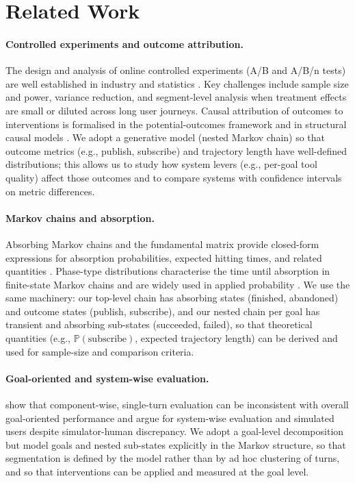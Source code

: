 \section{Related Work}
\label{sec:related_work}

\paragraph{Controlled experiments and outcome attribution.}
The design and analysis of online controlled experiments (A/B and A/B/n tests) are well established in industry and statistics \citep{kohavi2020trustworthy}. Key challenges include sample size and power, variance reduction, and segment-level analysis when treatment effects are small or diluted across long user journeys. Causal attribution of outcomes to interventions is formalised in the potential-outcomes framework \citep{rubin2005causal, imbens2015causal} and in structural causal models \citep{pearl2009causality}. We adopt a generative model (nested Markov chain) so that outcome metrics (e.g., publish, subscribe) and trajectory length have well-defined distributions; this allows us to study how system levers (e.g., per-goal tool quality) affect those outcomes and to compare systems with confidence intervals on metric differences.

\paragraph{Markov chains and absorption.}
Absorbing Markov chains and the fundamental matrix provide closed-form expressions for absorption probabilities, expected hitting times, and related quantities \citep{kemeny1976finite, norris1997markov}. Phase-type distributions characterise the time until absorption in finite-state Markov chains and are widely used in applied probability \citep{neuts1981matrix}. We use the same machinery: our top-level chain has absorbing states (finished, abandoned) and outcome states (publish, subscribe), and our nested chain per goal has transient and absorbing sub-states (succeeded, failed), so that theoretical quantities (e.g., $\mathbb{P}(\text{subscribe})$, expected trajectory length) can be derived and used for sample-size and comparison criteria.

\paragraph{Goal-oriented and system-wise evaluation.}
\citet{takanobu2020goal} show that component-wise, single-turn evaluation can be inconsistent with overall goal-oriented performance and argue for system-wise evaluation and simulated users despite simulator-human discrepancy. We adopt a goal-level decomposition but model goals and nested sub-states explicitly in the Markov structure, so that segmentation is defined by the model rather than by ad hoc clustering of turns, and so that interventions can be applied and measured at the goal level.

